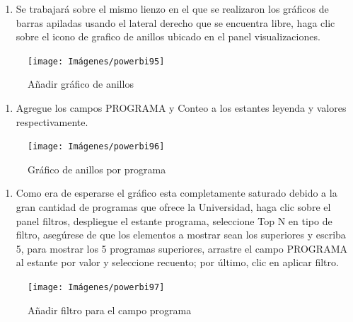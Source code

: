 \documentclass[
]{book}
\providecommand{\tightlist}{%
  \setlength{\itemsep}{0pt}\setlength{\parskip}{0pt}}
\begin{document}
\begin{enumerate}
\def\labelenumi{\arabic{enumi}.}
\tightlist
\item
  Se trabajará sobre el mismo lienzo en el que se realizaron los gráficos de barras apiladas usando el lateral derecho que se encuentra libre, haga clic sobre el icono de grafico de anillos ubicado en el panel visualizaciones.
\end{enumerate}

\begin{figure}

{\centering \texttt{[image: Imágenes/powerbi95]} 

}

\caption{Añadir gráfico de anillos}\label{fig:paso1anillos-fig}
\end{figure}

\begin{enumerate}
\def\labelenumi{\arabic{enumi}.}
\setcounter{enumi}{1}
\tightlist
\item
  Agregue los campos PROGRAMA y Conteo a los estantes leyenda y valores respectivamente.
\end{enumerate}

\begin{figure}

{\centering \texttt{[image: Imágenes/powerbi96]} 

}

\caption{Gráfico de anillos por programa}\label{fig:paso2anillos-fig}
\end{figure}

\begin{enumerate}
\def\labelenumi{\arabic{enumi}.}
\setcounter{enumi}{2}
\tightlist
\item
  Como era de esperarse el gráfico esta completamente saturado debido a la gran cantidad de programas que ofrece la Universidad, haga clic sobre el panel filtros, despliegue el estante programa, seleccione Top N en tipo de filtro, asegúrese de que los elementos a mostrar sean los superiores y escriba 5, para mostrar los 5 programas superiores, arrastre el campo PROGRAMA al estante por valor y seleccione recuento; por último, clic en aplicar filtro.
\end{enumerate}

\begin{figure}

{\centering \texttt{[image: Imágenes/powerbi97]} 

}

\caption{Añadir filtro para el campo programa}\label{fig:paso3anillos-fig}
\end{figure}
\end{document}

